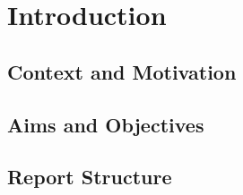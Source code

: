 \chapter{Introduction}

\section{Context and Motivation}

\section{Aims and Objectives}

\section{Report Structure}
